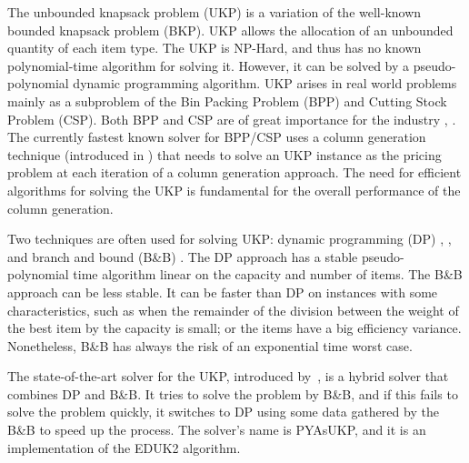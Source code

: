 \documentclass[runningheads,a4paper]{llncs}
\begin{document}
The unbounded knapsack problem (UKP) is a variation of the well-known bounded knapsack problem (BKP).
UKP allows the allocation of an unbounded quantity of each item type.
The UKP is NP-Hard, and thus has no known polynomial-time algorithm for solving it. 
However, it can be solved by a pseudo-polynomial dynamic programming algorithm.
UKP arises in real world problems mainly as a subproblem of the Bin Packing Problem (BPP) and Cutting Stock Problem (CSP). 
Both BPP and CSP are of great importance for the industry \cite{survey2014}, \cite{gg-1,gg-2}. 
The currently fastest known solver for BPP/CSP\cite{belov,survey2014}
uses a column generation technique (introduced in \cite{gg-1}) that needs to solve an UKP instance as the pricing problem at each iteration of a column generation approach. 
The need for efficient algorithms for solving the UKP is fundamental for the overall performance of the column generation.

Two techniques are often used for solving UKP: dynamic programming (DP) \cite{eduk}, \cite[p. 214]{gar72}, \cite[p. 311]{tchu} and branch and bound (B\&B) \cite{mtu2}. 
The DP approach has a stable pseudo-polynomial time algorithm linear on the capacity and number of items. 
The B\&B approach can be less stable. 
It can be faster than DP on instances with some characteristics, such as when the remainder of the division between the weight of the best item by the capacity is small; or the items have a big efficiency variance. Nonetheless, B\&B has always the risk of an exponential time worst case.

The state-of-the-art solver for the UKP, introduced by~\cite{pya}, is a hybrid solver that combines DP and B\&B. 
It tries to solve the problem by B\&B, and if this fails to solve the problem quickly, it switches to DP using some data gathered by the B\&B to speed up the process. 
The solver's name is PYAsUKP, and it is an implementation of the EDUK2 algorithm.%

\end{document}
